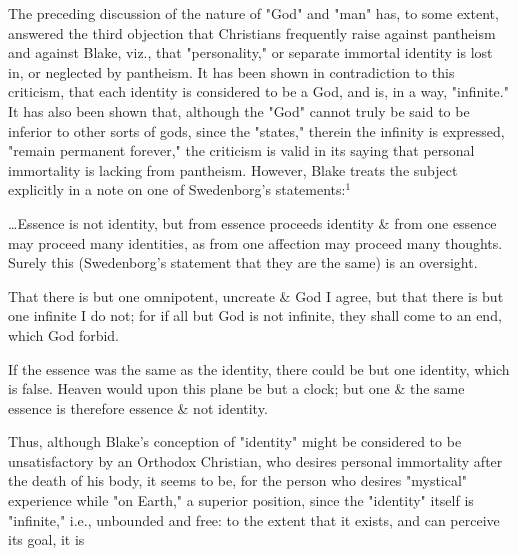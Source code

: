 The preceding discussion of the nature of "God" and "man" has, to some extent, answered the third objection that
Christians frequently raise against pantheism and against Blake, viz., that "personality," or separate immortal identity
is lost in, or neglected by pantheism. It has been shown in contradiction to this criticism, that each identity is
considered to be a God, and is, in a way, "infinite." It has also been shown that, although the "God" cannot truly be 
said to be inferior to other sorts of gods, since the "states," therein the infinity is expressed, "remain permanent forever,"
the criticism is valid in its saying that personal immortality is lacking from pantheism. However, Blake treats the subject 
explicitly in a note on one of Swedenborg's statements:$^{1}$\par
\begin{center}
	\parbox{0.8\textwidth}{
		\hspace*{5mm}\dots Essence is not identity, but from essence proceeds identity \& from
		one essence may proceed many identities, as from one affection may proceed many thoughts.
		Surely this (Swedenborg's statement that they are the same) is an oversight.\par
	}%
\end{center}
\begin{center}
	\parbox{0.8\textwidth}{
		\hspace*{5mm}That there is but one omnipotent, uncreate \& God I agree, but
		that there is but one infinite I do not; for if all but God is not infinite, they shall
		come to an end, which God forbid.\par
	}%
\end{center}
\begin{center}
	\parbox{0.8\textwidth}{
		\hspace*{5mm}If the essence was the same as the identity, there could be but one identity, which
		is false. Heaven would upon this plane be but a clock; but one \& the same
		essence is therefore essence \& not identity.\par
	}%
\end{center}
\hspace*{5mm}Thus, although Blake's conception of "identity" might be considered to be unsatisfactory
by an Orthodox Christian, who desires personal immortality after the death of his body, it seems to be, for
the person who desires "mystical" experience while "on Earth," a superior position, since the "identity" itself
is "infinite," i.e., unbounded and free: to the extent that it exists, and can perceive its goal, it is 

